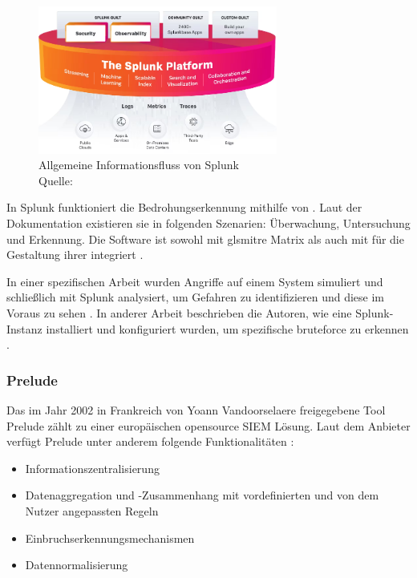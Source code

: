 \begin{figure}[H]
   \centering
   \includegraphics[width=0.7\textwidth]{assets/Splunk_informationsfluss.png}
   \caption[Allgemeine Informationsfluss von Splunk]
   {Allgemeine Informationsfluss von Splunk\\Quelle: \citep{Splunk_platform} }
   \centering
\end{figure}

In Splunk funktioniert die Bedrohungserkennung mithilfe von . Laut der Dokumentation existieren sie in folgenden Szenarien: Überwachung, Untersuchung und Erkennung. Die Software ist sowohl mit gls{mitre} Matrix als auch mit  für die Gestaltung ihrer  integriert \citep{Splunk_usecases}. 

In einer spezifischen Arbeit wurden Angriffe auf einem System simuliert und schließlich mit Splunk analysiert, um Gefahren zu identifizieren und diese im Voraus zu sehen \citep{Su_SplunkDDOS}. In anderer Arbeit beschrieben die Autoren, wie eine Splunk-Instanz installiert und konfiguriert wurden, um spezifische \gls{bruteforce} zu erkennen \citep{Selvaganesh_SplunkBruteForce}.
 
\subsubsection{Prelude}
Das im Jahr 2002 in Frankreich von Yoann Vandoorselaere freigegebene Tool Prelude zählt zu einer europäischen \gls{opensource} \gls{SIEM} Lösung. Laut dem Anbieter verfügt Prelude unter anderem folgende Funktionalitäten \citep{Prelude_SIEM}: 

\begin{itemize}[noitemsep]
   \item	Informationszentralisierung 
   \item	Datenaggregation und -Zusammenhang mit vordefinierten und von dem Nutzer angepassten Regeln 
   \item	Einbruchserkennungsmechanismen 
   \item	Datennormalisierung 
\end{itemize}

